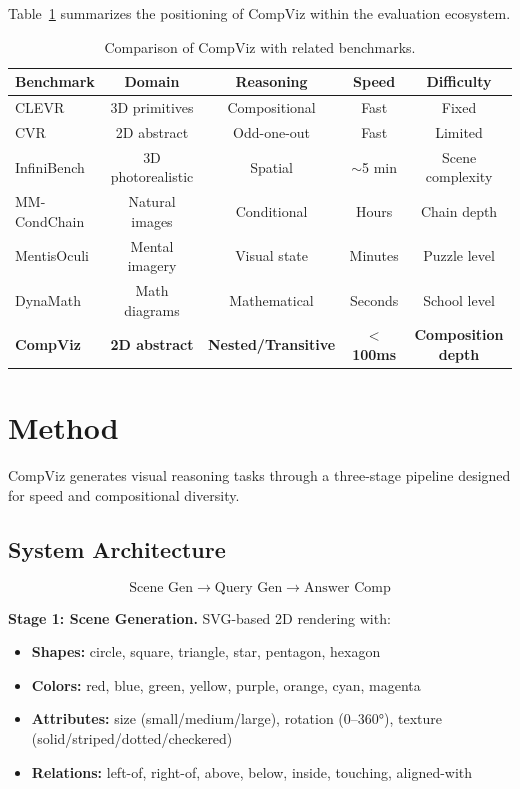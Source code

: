 \documentclass[11pt,a4paper]{article}
\begin{document}
Table~\ref{tab:comparison} summarizes the positioning of CompViz within the evaluation ecosystem.

\begin{table}[t]
\caption{Comparison of CompViz with related benchmarks.}
\label{tab:comparison}
\centering
\begin{tabular}{lcccc}
\toprule
\textbf{Benchmark} & \textbf{Domain} & \textbf{Reasoning} & \textbf{Speed} & \textbf{Difficulty} \\
\midrule
CLEVR & 3D primitives & Compositional & Fast & Fixed \\
CVR & 2D abstract & Odd-one-out & Fast & Limited \\
InfiniBench & 3D photorealistic & Spatial & $\sim$5 min & Scene complexity \\
MM-CondChain & Natural images & Conditional & Hours & Chain depth \\
MentisOculi & Mental imagery & Visual state & Minutes & Puzzle level \\
DynaMath & Math diagrams & Mathematical & Seconds & School level \\
\textbf{CompViz} & \textbf{2D abstract} & \textbf{Nested/Transitive} & \textbf{$<$100ms} & \textbf{Composition depth} \\
\bottomrule
\end{tabular}
\end{table}

\section{Method}

CompViz generates visual reasoning tasks through a three-stage pipeline designed for speed and compositional diversity.

\subsection{System Architecture}

\begin{equation}
\text{Scene Gen} \rightarrow \text{Query Gen} \rightarrow \text{Answer Comp}
\end{equation}

\textbf{Stage 1: Scene Generation.} SVG-based 2D rendering with:
\begin{itemize}
    \item \textbf{Shapes:} circle, square, triangle, star, pentagon, hexagon
    \item \textbf{Colors:} red, blue, green, yellow, purple, orange, cyan, magenta
    \item \textbf{Attributes:} size (small/medium/large), rotation (0--360°), texture (solid/striped/dotted/checkered)
    \item \textbf{Relations:} left-of, right-of, above, below, inside, touching, aligned-with
\end{itemize}
\end{document}
